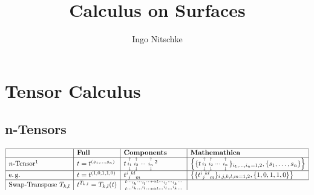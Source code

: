 \documentclass[9pt,a4paper]{scrartcl}
\title{Calculus on Surfaces}
\author{Ingo Nitschke}
\begin{document}
\maketitle
\tableofcontents

\section{Tensor Calculus}
  \subsection{n-Tensors}
  \begin{align*}
    \begin{array}{|l|l|l|l|}
    \hline
      &\textbf{Full} & \textbf{Components} & \textbf{Mathemathica} \\\hline
      n\text{-Tensor}\footnotemark
        & t = t^{(s_{1},\ldots,s_{n})}
            & t\begin{smallmatrix} 
                \shortuparrow & \shortuparrow &       & \shortuparrow \\
                i_{1}         & i_{2}         & \cdots& i_{n}     \\
                \shortdownarrow & \shortdownarrow &      & \shortdownarrow
              \end{smallmatrix}\footnotemark
                &\left\{ \{t\begin{smallmatrix} 
                \shortuparrow & \shortuparrow &       & \shortuparrow \\
                i_{1}         & i_{2}         & \cdots& i_{n}     \\
                \shortdownarrow & \shortdownarrow &      & \shortdownarrow
              \end{smallmatrix} \}_{i_{1},\ldots,i_{n}=1,2}, \{s_{1},\ldots,s_{n}\} \right\}
     \\\hline
      \text{\eg} 
          & t=t^{(1,0,1,1,0)} 
              & \tensor{t}{^{i}_{j}^{kl}_{m}} 
                & \left\{ \{\tensor{t}{^{i}_{j}^{kl}_{m}}\}_{i,j,k,l,m=1,2}, \{1,0,1,1,0\} \right\}
    \\\hline
    \text{Swap-Transpose }  T_{k,l} 
        & t^{T_{k,l}} = T_{k,l}(t)
            & \begin{smallmatrix}
                t\cdots_{i_{k}}\cdots_{i_{l}}\cdots \mapsto t\cdots_{i_{l}}\cdots_{i_{k}}\cdots \\
                t\cdots^{i_{k}}\cdots^{i_{l}}\cdots \mapsto t\cdots^{i_{l}}\cdots^{i_{k}}\cdots

\end{smallmatrix}
\end{array}
\end{align*}
\end{document}
